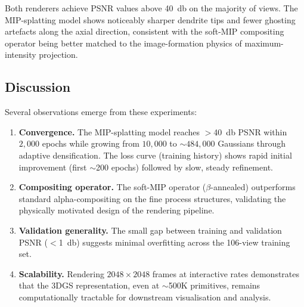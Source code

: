 Both renderers achieve PSNR values above \SI{40}{\decibel} on the
majority of views.  The MIP-splatting model shows noticeably sharper
dendrite tips and fewer ghosting artefacts along the axial direction,
consistent with the soft-MIP compositing operator being better matched
to the image-formation physics of maximum-intensity projection.

\subsection{Discussion}
\label{sec:exp-discussion}

Several observations emerge from these experiments:

\begin{enumerate}[label=(\roman*)]
  \item \textbf{Convergence.}
    The MIP-splatting model reaches $>$\SI{40}{\decibel} PSNR within
    $2{,}000$ epochs while growing from $10{,}000$ to $\sim484{,}000$
    Gaussians through adaptive densification.
    The loss curve (training history) shows rapid initial improvement
    (first $\sim$200 epochs) followed by slow, steady refinement.

  \item \textbf{Compositing operator.}
    The soft-MIP operator ($\beta$-annealed) outperforms standard
    alpha-compositing on the fine process structures, validating the
    physically motivated design of the rendering pipeline.

  \item \textbf{Validation generality.}
    The small gap between training and validation PSNR ($<$\SI{1}{\decibel})
    suggests minimal overfitting across the 106-view training set.

  \item \textbf{Scalability.}
    Rendering $2048\times2048$ frames at interactive rates demonstrates
    that the 3DGS representation, even at $\sim$500K primitives, remains
    computationally tractable for downstream visualisation and analysis.
\end{enumerate}
